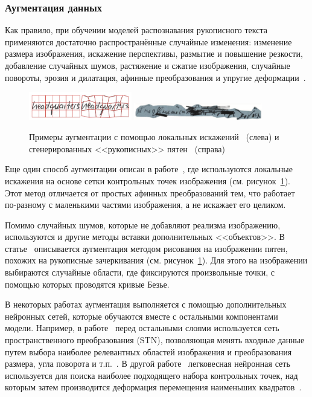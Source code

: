 \subsubsection{Аугментация данных}
\label{subsubsec:augmentation}

Как правило, при обучении моделей распознавания рукописного текста применяются достаточно распространённые случайные изменения:
изменение размера изображения, искажение перспективы, размытие и повышение резкости, добавление случайных шумов, растяжение и сжатие изображения,
случайные повороты, эрозия и дилатация, афинные преобразования и упругие деформации~\cite{sueiras2021continuous}.

\begin{figure}[h!]
    \centering
    \includegraphics[width=0.4\textwidth]{img/aug_local}
    \includegraphics[width=0.5\textwidth]{img/aug_blots}
    \caption{Примеры аугментации с помощью локальных искажений~\cite{wigington2017data} (слева) и сгенерированных <<рукописных>> пятен~\cite{shonenkov2021stackmix} (справа)}
    \label{fig:augmentation}
\end{figure}

Еще один способ аугментации описан в работе~\cite{wigington2017data}, где используются локальные искажения на основе сетки контрольных точек изображения (см. рисунок~\ref{fig:augmentation}).
Этот метод отличается от простых афинных преобразований тем, что работает по-разному с маленькими частями изображения, а не искажает его целиком.

Помимо случайных шумов, которые не добавляют реализма изображению, используются и другие методы вставки дополнительных <<объектов>>.
В статье~\cite{shonenkov2021stackmix} описывается аугментация методом рисования на изображении пятен, похожих на рукописные зачеркивания (см. рисунок~\ref{fig:augmentation}).
Для этого на изображении выбираются случайные области, где фиксируются произвольные точки, с помощью которых проводятся кривые Безье.

В некоторых работах аугментация выполняется с помощью дополнительных нейронных сетей, которые обучаются вместе с остальными компонентами модели.
Например, в работе~\cite{krishnan2018word} перед остальными слоями используется сеть пространственного преобразования (STN),
позволяющая менять входные данные путем выбора наиболее релевантных областей изображения и преобразования размера, угла поворота и т.п.~\cite{jaderberg2015spatial}.
В другой работе~\cite{luo2020learn} легковесная нейронная сеть используется для поиска наиболее подходящего набора
контрольных точек, над которым затем производится деформация перемещения наименьших квадратов~\cite{schaefer2006image}.

